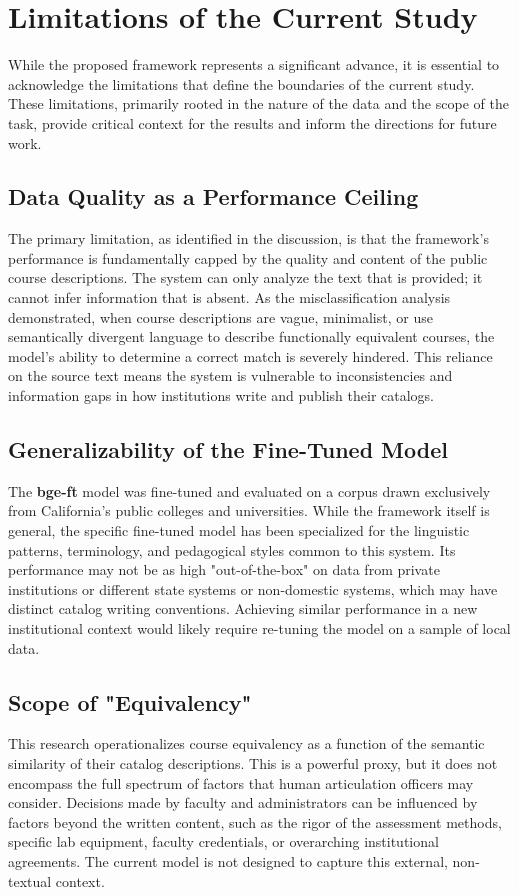 \section{Limitations of the Current Study}\label{ch:5.2}
While the proposed framework represents a significant advance, it is essential to acknowledge the limitations that define the boundaries of the current study. These limitations, primarily rooted in the nature of the data and the scope of the task, provide critical context for the results and inform the directions for future work.

\subsection{Data Quality as a Performance Ceiling}\label{ch:5.2.1}
The primary limitation, as identified in the discussion, is that the framework's performance is fundamentally capped by the quality and content of the public course descriptions. The system can only analyze the text that is provided; it cannot infer information that is absent. As the misclassification analysis demonstrated, when course descriptions are vague, minimalist, or use semantically divergent language to describe functionally equivalent courses, the model's ability to determine a correct match is severely hindered. This reliance on the source text means the system is vulnerable to inconsistencies and information gaps in how institutions write and publish their catalogs.

\subsection{Generalizability of the Fine-Tuned Model}\label{ch:5.2.2}
The \textbf{bge-ft} model was fine-tuned and evaluated on a corpus drawn exclusively from California's public colleges and universities. While the framework itself is general, the specific fine-tuned model has been specialized for the linguistic patterns, terminology, and pedagogical styles common to this system. Its performance may not be as high "out-of-the-box" on data from private institutions or different state systems or non-domestic systems, which may have distinct catalog writing conventions. Achieving similar performance in a new institutional context would likely require re-tuning the model on a sample of local data.

\subsection{Scope of "Equivalency"}\label{ch:5.2.3}
This research operationalizes course equivalency as a function of the semantic similarity of their catalog descriptions. This is a powerful proxy, but it does not encompass the full spectrum of factors that human articulation officers may consider. Decisions made by faculty and administrators can be influenced by factors beyond the written content, such as the rigor of the assessment methods, specific lab equipment, faculty credentials, or overarching institutional agreements. The current model is not designed to capture this external, non-textual context.

